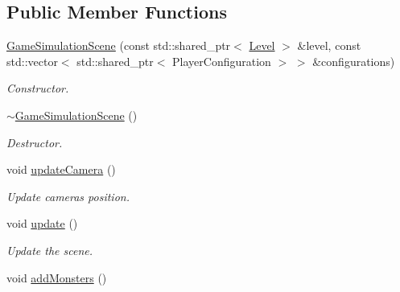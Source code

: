 \subsection*{Public Member Functions}
\begin{DoxyCompactItemize}
\item 
\mbox{\label{classGameSimulationScene_a979dd106ca106b60542b77eaa99b43bf}} 
\hyperlink{classGameSimulationScene_a979dd106ca106b60542b77eaa99b43bf}{Game\+Simulation\+Scene} (const std\+::shared\+\_\+ptr$<$ \hyperlink{classLevel}{Level} $>$ \&level, const std\+::vector$<$ std\+::shared\+\_\+ptr$<$ Player\+Configuration $>$ $>$ \&configurations)
\begin{DoxyCompactList}\small\item\em Constructor. \end{DoxyCompactList}\item 
\mbox{\label{classGameSimulationScene_af45f3e7f70376e59a6f320f21ce2897b}} 
\hyperlink{classGameSimulationScene_af45f3e7f70376e59a6f320f21ce2897b}{$\sim$\+Game\+Simulation\+Scene} ()
\begin{DoxyCompactList}\small\item\em Destructor. \end{DoxyCompactList}\item 
\mbox{\label{classGameSimulationScene_aae1a8d0e8d3f8b1cc51c9291b96c52ec}} 
void \hyperlink{classGameSimulationScene_aae1a8d0e8d3f8b1cc51c9291b96c52ec}{update\+Camera} ()
\begin{DoxyCompactList}\small\item\em Update camera\textquotesingle{}s position. \end{DoxyCompactList}\item 
\mbox{\label{classGameSimulationScene_ad8aa00e84395730039cfb6ef926917ea}} 
void \hyperlink{classGameSimulationScene_ad8aa00e84395730039cfb6ef926917ea}{update} ()
\begin{DoxyCompactList}\small\item\em Update the scene. \end{DoxyCompactList}\item 
\mbox{\label{classGameSimulationScene_a4ca88431209fea3a0050e0e5b63b60eb}} 
void \hyperlink{classGameSimulationScene_a4ca88431209fea3a0050e0e5b63b60eb}{add\+Monsters} ()

\end{DoxyCompactItemize}
